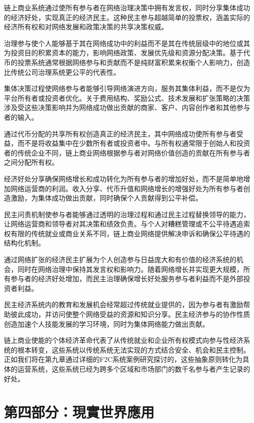 \documentclass[
  Letterpaper,
]{scrbook}
\begin{document}
链上商业系统通过使所有参与者在网络治理决策中拥有发言权，同时分享集体成功的经济好处，实现真正的经济民主。这种民主参与超越简单的投票权，涵盖实际的经济所有权和对网络发展和政策决策的共享决策权威。

治理参与使个人能够基于其在网络成功中的利益而不是其在传统层级中的地位或其为投资目的积累资本的能力，影响网络政策、发展优先级和资源分配决策。基于代币的投票系统通常根据网络参与和贡献而不是纯财富积累来权衡个人影响力，创造比传统公司治理系统更公平的代表性。

集体决策过程使网络参与者能够引导网络演进方向，服务其集体利益，而不是仅为平台所有者或投资者优化。关于费用结构、奖励公式、技术发展和扩张策略的决策涉及受这些决策影响并为网络成功做出贡献的商家、客户、内容创作者和其他参与者的输入。

通过代币分配的共享所有权创造真正的经济民主，其中网络成功使所有参与者受益，而不是将收益集中在少数所有者或投资者中。与所有权通常限于创始人和投资者的传统企业不同，链上商业网络根据参与者对网络价值创造的贡献在所有参与者之间分配所有权。

经济好处分享确保网络增长和成功转化为所有参与者的增加好处，而不是简单地增加网络运营商的利润。收入分享、代币升值和网络增长的增强好处为所有参与者创造激励，为集体成功做出贡献，同时确保个人贡献得到公平补偿。

民主问责机制使参与者能够通过透明的治理过程和通过民主过程替换领导的能力，让网络运营商和领导者对其决策和绩效负责。与个人对糟糕管理或不公平待遇追索权有限的传统就业或商业关系不同，链上商业网络提供解决申诉和确保公平待遇的结构化机制。

通过网络扩张的经济民主扩展为个人创造参与日益庞大和有价值的经济系统的机会，同时在网络治理中保持其发言权和影响力。随着网络增长并实现更大规模，所有参与者的经济好处增加，而民主治理确保增长好处服务参与者利益而不是外部投资者利益。

民主经济系统内的教育和发展机会经常超过传统就业提供的，因为参与者有激励帮助彼此成功，并访问使整个网络受益的资源和知识分享。民主经济参与的协作性质创造加速个人技能发展的学习环境，同时为集体网络能力做出贡献。

链上商业使能的个体经济革命代表了从传统就业和企业所有权模式向参与性经济系统的根本转变，这些系统以传统系统无法实现的方式结合安全、机会和民主控制。正如我们将在第九章通过详细的F2C系统案例研究探讨的，这些抽象原则转化为具体的运营系统，这些系统已经为跨多个区域和市场部门的数千名参与者产生记录的好处。

\part{第四部分：現實世界應用}
\end{document}
